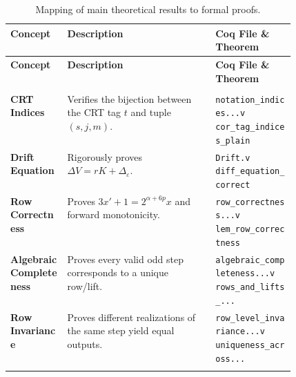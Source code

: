 \documentclass[11pt,letterpaper]{amsart}
\theoremstyle{definition}
\theoremstyle{plain}
\theoremstyle{plain}
\theoremstyle{remark}
\begin{document}
\begingroup
\renewcommand{\arraystretch}{1.15}
\scriptsize\sloppy
\begin{xltabular}{\linewidth}{@{}>{\raggedright\arraybackslash}p{0.20\linewidth} X >{\raggedright\arraybackslash}p{0.28\linewidth}@{}}
\caption{Mapping of main theoretical results to formal proofs.} \label{tab:coq-index} \\

\toprule
\textbf{Concept} & \textbf{Description} & \textbf{Coq File \& Theorem} \\
\midrule
\endfirsthead

\toprule
\textbf{Concept} & \textbf{Description} & \textbf{Coq File \& Theorem} \\
\midrule
\endhead

\bottomrule
\endfoot

 \\
\midrule
\textbf{CRT Indices} &
  Verifies the bijection between the CRT tag $t$ and tuple $(s,j,m)$. &
  \texttt{notation\_indices...v} \newline
  \texttt{cor\_tag\_indices\_plain} \\
\addlinespace[4pt]

\textbf{Drift Equation} &
  Rigorously proves $\Delta V = rK + \Delta_\varepsilon$. &
  \texttt{Drift.v} \newline
  \texttt{diff\_equation\_correct} \\
\addlinespace[4pt]

\textbf{Row Correctness} &
  Proves $3x'+1 = 2^{\alpha+6p}x$ and forward monotonicity. &
  \texttt{row\_correctness...v} \newline
  \texttt{lem\_row\_correctness} \\
\addlinespace[4pt]

\textbf{Algebraic Completeness} &
  Proves every valid odd step corresponds to a unique row/lift. &
  \texttt{algebraic\_completeness...v} \newline
  \texttt{rows\_and\_lifts\_...} \\
\addlinespace[4pt]

\textbf{Row Invariance} &
  Proves different realizations of the same step yield equal outputs. &
  \texttt{row\_level\_invariance...v} \newline
  \texttt{uniqueness\_across...} \\
\addlinespace[4pt]


\end{xltabular}
\end{document}
